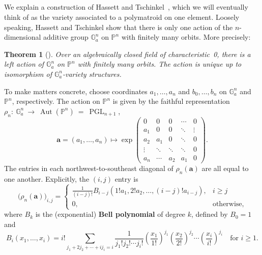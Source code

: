 \documentclass[11pt]{article}
\newtheorem{theo}{Theorem}[section]
\theoremstyle{definition}
\numberwithin{equation}{section}
\DeclareMathOperator{\Aut}{Aut}
\DeclareMathOperator{\PGL}{PGL}
\renewcommand{\P}{\mathbb{P}}
\newcommand{\Ga}{\mathbb{G}_a}
\newcommand{\G}{\mathbb{G}}
\newcommand{\word}[1]{\textbf{#1}}
\begin{document}
\subsection{}\label{sec_HT}
We explain a construction of Hassett and Tschinkel~\cite{HT99}, which we will eventually think of as the variety associated to a polymatroid on one element.
Loosely speaking, Hassett and Tschinkel show that there is only one action of the $n$-dimensional additive group $\G_a^n$ on $\P^n$ with finitely many orbits. More precisely:
\begin{theo}[{\cite[Proposition 3.7]{HT99}}]\label{HT}
  Over an algebraically closed field of characteristic~0, there is a left action of $\G_a^n$ on $\P^n$ with finitely many orbits.
  The action is unique up to isomorphism of $\G_a^n$-variety structures.
\end{theo}
To make matters concrete, choose coordinates $a_1, \ldots, a_n$ and $b_0,\ldots, b_n$ on  $\Ga^n$ and $\P^n$, respectively.
The action on $\P^n$ is given by the faithful representation $\rho_n:~\Ga^n~\to~\Aut(\P^n)~=~\PGL_{n+1}$,
\[
  \mathbf a = (a_1, \ldots, a_n) \mapsto \exp
                                  \begin{pmatrix}
                                    0 & 0 & 0 & \cdots & 0\\
                                    a_1 & 0 & 0 & \ddots & \vdots\\
                                    a_2 & a_1 & 0 & \ddots & 0 \\
                                    \vdots & \ddots & \ddots & \ddots & 0 \\
                                    a_n & \cdots & a_2 & a_1 & 0
                                  \end{pmatrix}.
\]
The entries in each northwest-to-southeast diagonal of $\rho_n(\mathbf a)$ are all equal to one another.
Explicitly, the $(i,j)$ entry is
\[
  \big(\rho_n(\mathbf a)\big)_{i,j} =
  \begin{cases}
    \frac{1}{(i-j)!} B_{i-j}(1! a_1, 2! a_2, \ldots, (i-j)! a_{i-j}), & i \geq j \\
    0, & \text{otherwise,}
  \end{cases}
\]
where $B_k$ is the (exponential) \word{Bell polynomial} of degree $k$, defined by  $B_0 = 1$ and
\[
  B_i(x_1, \ldots, x_i) = i! \sum_{j_1+2j_2 + \cdots + i j_i = i} \frac{1}{j_1! j_2! \cdots j_i!}
  \left(\frac{x_1}{1!}\right)^{j_1}
  \left(\frac{x_2}{2!}\right)^{j_2} \cdots
  \left(\frac{x_i}{i!}\right)^{j_i}
  \quad \text{for $i \geq 1$.}
\]
\end{document}
